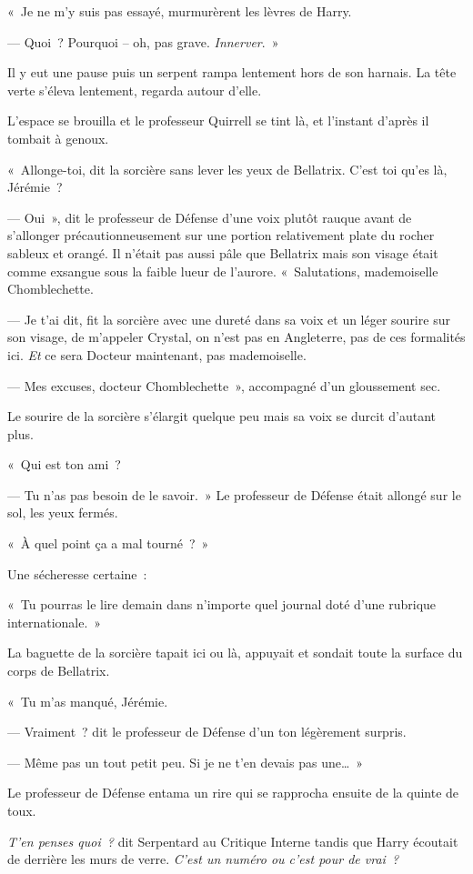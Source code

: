 «~Je ne m'y suis pas essayé, murmurèrent les lèvres de Harry.

--- Quoi~? Pourquoi -- oh, pas grave. \emph{Innerver}.~»

Il y eut une pause puis un serpent rampa lentement hors de son harnais. La tête verte s'éleva lentement, regarda autour d'elle.

L'espace se brouilla et le professeur Quirrell se tint là, et l'instant d'après il tombait à genoux.

«~Allonge-toi, dit la sorcière sans lever les yeux de Bellatrix. C'est toi qu'es là, Jérémie~?

--- Oui~», dit le professeur de Défense d'une voix plutôt rauque avant de s'allonger précautionneusement sur une portion relativement plate du rocher sableux et orangé. Il n'était pas aussi pâle que Bellatrix mais son visage était comme exsangue sous la faible lueur de l'aurore. «~Salutations, mademoiselle Chomblechette.

--- Je t'ai dit, fit la sorcière avec une dureté dans sa voix et un léger sourire sur son visage, de m'appeler Crystal, on n'est pas en Angleterre, pas de ces formalités ici. \emph{Et} ce sera Docteur maintenant, pas mademoiselle.

--- Mes excuses, docteur Chomblechette~», accompagné d'un gloussement sec.

Le sourire de la sorcière s'élargit quelque peu mais sa voix se durcit d'autant plus.

«~Qui est ton ami~?

--- Tu n'as pas besoin de le savoir.~» Le professeur de Défense était allongé sur le sol, les yeux fermés.

«~À quel point ça a mal tourné~?~»

Une sécheresse certaine~:

«~Tu pourras le lire demain dans n'importe quel journal doté d'une rubrique internationale.~»

La baguette de la sorcière tapait ici ou là, appuyait et sondait toute la surface du corps de Bellatrix.

«~Tu m'as manqué, Jérémie.

--- Vraiment~? dit le professeur de Défense d'un ton légèrement surpris.

--- Même pas un tout petit peu. Si je ne t'en devais pas une…~»

Le professeur de Défense entama un rire qui se rapprocha ensuite de la quinte de toux.

\emph{T'en penses quoi~?} dit Serpentard au Critique Interne tandis que Harry écoutait de derrière les murs de verre. \emph{C'est un numéro ou c'est pour de vrai~?}

